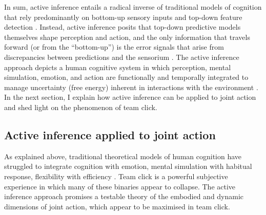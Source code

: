 \begin{CJK}{UTF8}{gbsn}

In sum, active inference \citep[and the predictive coding paradigm which it extends, see][]{Clark2013} entails a radical inverse of traditional models of cognition that rely predominantly on bottom-up sensory inputs and top-down feature detection \citep[e.g.,][]{Marr1985}. Instead, active inference posits that top-down predictive models themselves shape perception and action, and the only information that travels forward (or from the ``bottom-up'') is the error signals that arise from discrepancies between predictions and the sensorium \citep{Pickering2014}.  The active inference approach depicts a human cognitive system in which perception, mental simulation, emotion, and action are functionally and temporally integrated to manage uncertainty (free energy) inherent in interactions with the environment \citep{Clark2013}.  In the next section, I explain how active inference can be applied to joint action and shed light on the phenomenon of team click.


\subsection{Active inference applied to joint action \label{sect:activeInfJA}}

As explained above, traditional theoretical models of human cognition have struggled to integrate cognition with emotion, mental simulation with habitual response, flexibility with efficiency \citep{Clark2015}.
Team click is a powerful subjective experience in which many of these binaries appear to collapse.  The active inference approach promises a testable theory of the embodied and dynamic dimensions of joint action, which appear to be maximised in team click.


\end{CJK}
